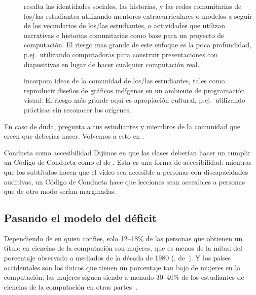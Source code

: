 \begin{description}

\item[{}]
  resalta las identidades sociales, las historias, y las redes comunitarias de los/las estudiantes
  utilizando mentores extracurriculares o modelos a seguir de los vecindarios de los/las estudiantes,
  o actividades que utilizan narrativas e historias comunitarias
  como base para un proyecto de computación.
  El riesgo mas grande de este enfoque es la poca profundidad,
  p.ej.\ utilizando computadoras para construir presentaciones con diapositivas en lugar de hacer cualquier computación real.

\item[{}]
  incorpora ideas de la comunidad de los/las estudiantes,
  tales como reproducir diseños de gráficos indígenas en un ambiente de programación visual.
  El riesgo más grande aquí es apropiación cultural,
  p.ej.\ utilizando prácticas sin reconocer los orígenes.

\end{description}

En caso de duda,
pregunta a tus estudiantes y miembros de la comunidad que creen que deberías hacer.
Volvemos a esto en .

\begin{aside}{Conducta como accesibilidad}
  Dijimos en  que las clases deberían hacer un cumplir un Código de Conducta como el de .
  Esta es una forma de accesibilidad:
  mientras que los subtitulos hacen que el video sea accesible a personas con discapacidades auditivas,
  un Código de Conducta hace que lecciones sean accesibles a personas que de otro modo serían marginadas.
\end{aside}

\subsection*{Pasando el modelo del déficit}

Dependiendo de en quien confies,
solo 12--18\% de las personas que obtienen un título en ciencias de la computación son mujeres,
que es menos de la mitad del porcentaje observado a mediados de la década de 1980
(, de~\cite{Robe2017}).
Y los países occidentales son los únicos que tienen un porcentaje tan bajo de mujeres en la computación;
las mujeres siguen siendo a menudo 30--40\% de los estudiantes de ciencias de la computación en otras partes~\cite{Galp2002,Varm2015}.

